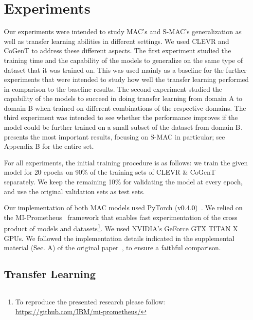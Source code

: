 \section{Experiments}
\label{sec:experiments}

Our experiments were intended to study MAC's and S-MAC's generalization as well as transfer learning abilities in different settings. We used CLEVR and CoGenT to address these different aspects.
The first experiment studied the training time and the capability of the models to generalize on the same type of dataset that it was trained on. This was used mainly as a baseline for the further experiments that were intended to study how well the transfer learning performed in comparison to the baseline results.
The second experiment studied the capability of the models to succeed in doing transfer learning from domain A to domain B when trained on different combinations of the respective domains. The third experiment was intended to see whether the performance improves if the model could be further trained on a small subset of the dataset from domain B.
 presents the most important results, focusing on S-MAC in particular; see Appendix B for the entire set.

For all experiments, the initial training procedure is as follows: we train the given model  for 20 epochs on 90\% of the training sets of CLEVR \& CoGenT separately. We keep the remaining 10\% for validating the model at every epoch, and use the original validation sets as test sets.

Our implementation of both MAC models used PyTorch (v0.4.0)~\cite{paszke2017automatic}. We relied on the MI-Prometheus~\cite{kornuta2018accelerating} framework that enables fast experimentation of the cross product of models and datasets\footnote{To reproduce the presented research please follow:  \url{https://github.com/IBM/mi-prometheus/}}.
We used NVIDIA's GeForce GTX TITAN X GPUs. We followed the implementation details indicated in the supplemental material (Sec. A) of the original paper~\cite{hudson2018compositional}, to ensure a faithful comparison.

\subsection{Transfer Learning}

